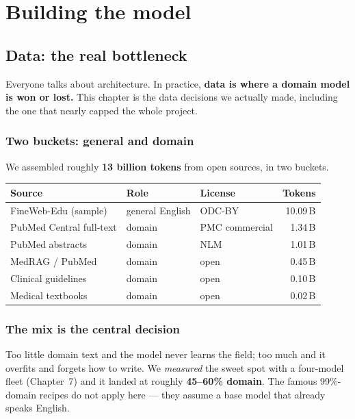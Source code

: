 \part{Building the model}

\chapter{Data: the real bottleneck}

Everyone talks about architecture. In practice, \textbf{data is where a domain model is won or lost.} This
chapter is the data decisions we actually made, including the one that nearly capped the whole project.

\section{Two buckets: general and domain}
We assembled roughly \textbf{13 billion tokens} from open sources, in two buckets.

\begin{center}\small
\begin{tabular}{@{}lll r@{}}
\toprule
\textbf{Source} & \textbf{Role} & \textbf{License} & \textbf{Tokens}\\
\midrule
FineWeb-Edu (sample) & general English & ODC-BY & 10.09\,B\\
PubMed Central full-text & domain & PMC commercial & 1.34\,B\\
PubMed abstracts & domain & NLM & 1.01\,B\\
MedRAG / PubMed & domain & open & 0.45\,B\\
Clinical guidelines & domain & open & 0.10\,B\\
Medical textbooks & domain & open & 0.02\,B\\
\bottomrule
\end{tabular}
\end{center}

\section{The mix is the central decision}

\noindent Too little domain text and the model never learns the field; too much and it overfits and forgets
how to write. We \emph{measured} the sweet spot with a four-model fleet (Chapter~7) and it landed at roughly
\textbf{45--60\% domain}. The famous 99\%-domain recipes do not apply here --- they assume a base model that
already speaks English.

